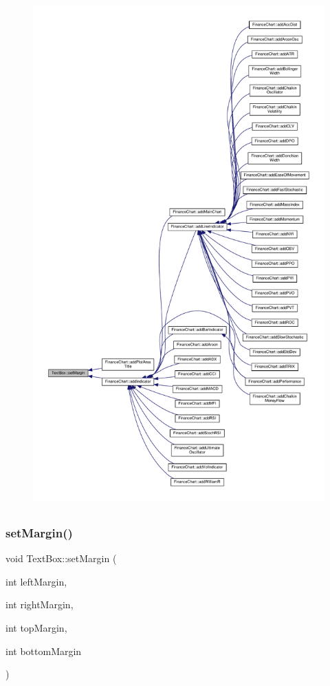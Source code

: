 \begin{figure}[H]
\begin{center}
\leavevmode
\includegraphics[height=550pt]{class_text_box_aaadf6bbde148a221869df43c11a0d623_icgraph}
\end{center}
\end{figure}
\mbox{\label{class_text_box_a4e56a85bbd89b369c13d9f9e571f1950}} 
\subsubsection{\texorpdfstring{set\+Margin()}{setMargin()}\hspace{0.1cm}{\footnotesize\ttfamily [2/2]}}
{\footnotesize\ttfamily void Text\+Box\+::set\+Margin (\begin{DoxyParamCaption}\item[{int}]{left\+Margin,  }\item[{int}]{right\+Margin,  }\item[{int}]{top\+Margin,  }\item[{int}]{bottom\+Margin }\end{DoxyParamCaption})\hspace{0.3cm}{\ttfamily [inline]}}



